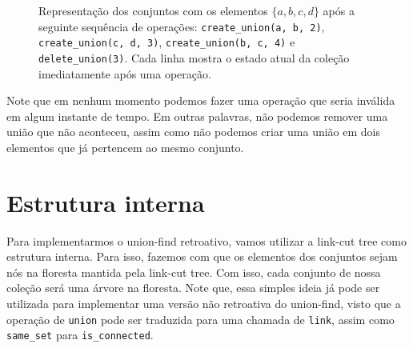 \begin{figure}[h!]
\begin{subfigure}{\textwidth}
        \bigskip
    \end{subfigure}
    \begin{subfigure}{\textwidth}
        \centering
    \end{subfigure}
    \caption{Representação dos conjuntos com os elementos $\{a,b,c,d\}$ após a seguinte sequência de operações: \texttt{create\_union(a, b, 2)}, \texttt{create\_union(c, d, 3)}, \texttt{create\_union(b, c, 4)} e \texttt{delete\_union(3)}. Cada linha mostra o estado atual da coleção imediatamente após uma operação.}
    \label{fig:uf-sets}
\end{figure}

Note que em nenhum momento podemos fazer uma operação que seria inválida em algum instante de tempo. Em outras palavras, não podemos remover uma união que não aconteceu, assim como não podemos criar uma união em dois elementos que já pertencem ao mesmo conjunto.

\section{Estrutura interna}
\label{sec:uf-estrutura}

Para implementarmos o union-find retroativo, vamos utilizar a link-cut tree como estrutura interna. Para isso, fazemos com que os elementos dos conjuntos sejam nós na floresta mantida pela link-cut tree. Com isso, cada conjunto de nossa coleção será uma árvore na floresta. Note que, essa simples ideia já pode ser utilizada para implementar uma versão não retroativa do union-find, visto que a operação de \texttt{union} pode ser traduzida para uma chamada de \texttt{link}, assim como \texttt{same\_set} para \texttt{is\_connected}.

